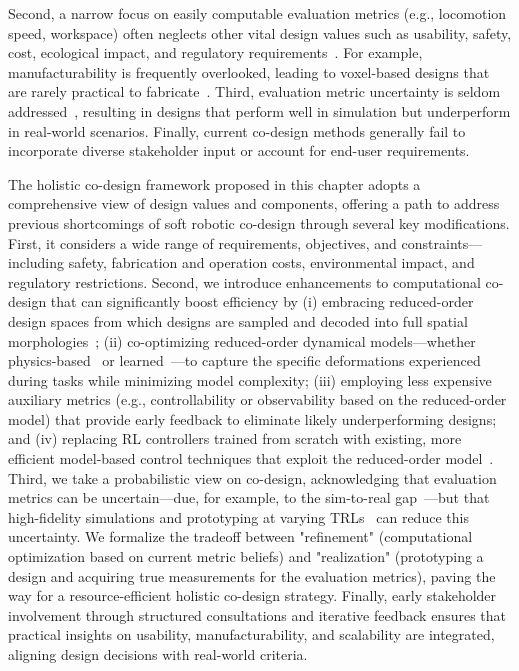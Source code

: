% 
Second, a narrow focus on easily computable evaluation metrics (e.g., locomotion speed, workspace) often neglects other vital design values such as usability, safety, cost, ecological impact, and regulatory requirements~\citep{junge2022leveraging}. For example, manufacturability is frequently overlooked, leading to voxel-based designs that are rarely practical to fabricate~\citep{legrand2023reconfigurable, wang2024diffusebot}.
% 
Third, evaluation metric uncertainty is seldom addressed~\citep{chen2020design}, resulting in designs that perform well in simulation but underperform in real-world scenarios.
% 
Finally, current co-design methods generally fail to incorporate diverse stakeholder input or account for end-user requirements.

The holistic co-design framework proposed in this chapter adopts a comprehensive view of design values and components, offering a path to address previous shortcomings of soft robotic co-design through several key modifications. First, it considers a wide range of requirements, objectives, and constraints—including safety, fabrication and operation costs, environmental impact, and regulatory restrictions. Second, we introduce enhancements to computational co-design that can significantly boost efficiency by (i) embracing reduced-order design spaces from which designs are sampled and decoded into full spatial morphologies~\citep{wang2024diffusebot}; (ii) co-optimizing reduced-order dynamical models—whether physics-based~\citep{armanini2023soft, alkayas2025soft} or learned~\citep{liu2024physics, stolzle2024input}—to capture the specific deformations experienced during tasks while minimizing model complexity; (iii) employing less expensive auxiliary metrics (e.g., controllability or observability based on the reduced-order model) that provide early feedback to eliminate likely underperforming designs; and (iv) replacing RL controllers trained from scratch with existing, more efficient model-based control techniques that exploit the reduced-order model~\citep{della2023model, stolzle2024input}. Third, we take a probabilistic view on co-design, acknowledging that evaluation metrics can be uncertain—due, for example, to the sim-to-real gap~\citep{dubied2022sim}—but that high-fidelity simulations and prototyping at varying \glspl{TRL}~\citep{NASA_TRL} can reduce this uncertainty. We formalize the tradeoff between "refinement" (computational optimization based on current metric beliefs) and "realization" (prototyping a design and acquiring true measurements for the evaluation metrics), paving the way for a resource-efficient holistic co-design strategy. Finally, early stakeholder involvement through structured consultations and iterative feedback ensures that practical insights on usability, manufacturability, and scalability are integrated, aligning design decisions with real-world criteria.

